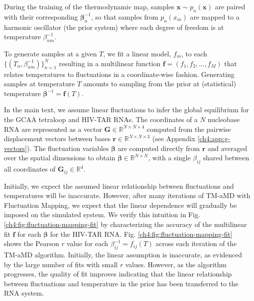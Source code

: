 During the training of the thermodynamic map, samples $\mathbf{x} \sim p_n(\mathbf{x})$ are paired with their corresponding $\bm{\beta}^{-1}_n$, so that samples from $ p_n(x_m)$ are mapped to a harmonic oscillator (the prior system) where each degree of freedom is at temperature $\beta^{-1}_{nm}$.

To generate samples at a given $T$, we fit a linear model, $f_m$, to each $\{(T_n,\beta^{-1}_{nm})\}_{n=1}^N$ resulting in a multilinear function $\mathbf{f} = (f_1,f_2,\ldots,f_M)$ that relates temperatures to fluctuations in a coordinate-wise fashion. Generating samples at temperature $T$ amounts to sampling from the prior at (statistical) temperature $\bm{\beta}^{-1} = \mathbf{f}(T)$.

In the main text, we assume linear fluctuations to infer the global equilibrium for the GCAA tetraloop and HIV-TAR RNAs. The coordinates of a $N$ nucleobase RNA are represented as a vector $\mathbf{G} \in \mathbb{R}^{N\times N \times 4}$ computed from the pairwise displacement vectors between bases $\mathbf{r} \in \mathbb{R}^{N \times N \times 3}$ (see Appendix \ref{ch4:app:g-vectors}). The fluctuation variables $\bm{\beta}$ are computed directly from $\mathbf{r}$ and averaged over the spatial dimensions to obtain $\bm{\beta} \in \mathbb{R}^{N \times N}$, with a single $\beta_{ij}$ shared between all coordinates of $\mathbf{G}_{ij}\in \mathbb{R}^4$.

Initially, we expect the assumed linear relationship between fluctuations and temperatures will be inaccurate. However, after many iterations of TM-aMD with Fluctuation Mapping, we expect that the linear dependence will gradually be imposed on the simulated system. We verify this intuition in Fig. \ref{ch4:fig:fluctuation-mapping-fit} by characterizing the accuracy of the multilinear fit $\mathbf{f}$ for each $\bm{\beta}$ for the HIV-TAR RNA. Fig. \ref{ch4:fig:fluctuation-mapping-fit} shows the Pearson $r$ value for each $\beta_{ij}^{-1} = f_{ij}(T)$ across each iteration of the TM-aMD algorithm. Initially, the linear assumption is inaccurate, as evidenced by the large number of fits with small $r$ values. However, as the algorithm progresses, the quality of fit improves indicating that the linear relationship between fluctuations and temperature in the prior has been transferred to the RNA system.


